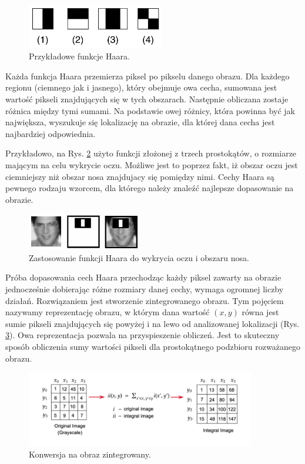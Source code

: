\begin{figure}[h]
	\centering
	\includegraphics[width=6cm]{haar_features.png}
	\caption{Przykładowe funkcje Haara. \cite{haarCascade}} 
	\label{fig:haarFeatures}
\end{figure}

Każda funkcja Haara przemierza piksel po pikselu danego obrazu. Dla każdego regionu (ciemnego jak i jasnego), który obejmuje owa cecha, sumowana jest wartość pikseli znajdujących się w tych obszarach. Następnie obliczana zostaje różnica między tymi sumami. Na podstawie owej różnicy, która powinna być jak największa, wyszukuje się lokalizację na obrazie, dla której dana cecha jest najbardziej odpowiednia. 

Przykładowo, na Rys. \ref{fig:haarNose} użyto funkcji złożonej z trzech prostokątów, o rozmiarze mającym na celu wykrycie oczu. Możliwe jest to poprzez fakt, iż obszar oczu jest ciemniejszy niż obszar nosa znajdujacy się pomiędzy nimi. Cechy Haara są pewnego rodzaju wzorcem, dla którego należy znaleźć najlepsze dopasowanie na obrazie.
 
\begin{figure}[h]
	\centering
	\includegraphics[width=5cm]{haar_nose_feature.png}
	\caption{Zastosowanie funkcji Haara do wykrycia oczu i obszaru nosa.} 
	\label{fig:haarNose}
\end{figure}

Próba dopasowania cech Haara przechodząc każdy piksel zawarty na obrazie jednocześnie dobierając różne rozmiary danej cechy, wymaga ogromnej liczby działań. Rozwiązaniem jest stworzenie zintegrowanego obrazu. Tym pojęciem nazywamy reprezentację obrazu, w którym dana wartość $(x, y)$ równa jest sumie pikseli znajdujących się powyżej i na lewo od analizowanej lokalizacji (Rys. \ref{fig:integralImage}). Owa reprezentacja pozwala na przyspieszenie obliczeń. Jest to skuteczny sposób obliczenia sumy wartości pikseli dla prostokątnego podzbioru rozważanego obrazu.
 
 \begin{figure}[h]
	\centering
	\includegraphics[width=10cm]{integral.png}
	\caption{Konwersja na obraz zintegrowany. \cite{haarCascade}} 
	\label{fig:integralImage}
\end{figure}
 
